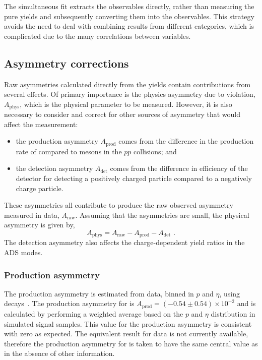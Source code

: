The simultaneous fit extracts the \CP observables directly, rather than measuring the pure yields and subsequently converting them into the \CP observables. This strategy avoids the need to deal with combining results from different categories, which is complicated due to the many correlations between variables. 

\subsection{Asymmetry corrections}
\label{sec:cpfit:asymmetries}

Raw asymmetries calculated directly from the yields contain contributions from several effects. Of primary importance is the physics asymmetry due to \CP violation, $A_{\text{phys}}$, which is the physical parameter to be measured. However, it is also necessary to consider and correct for other sources of asymmetry that would affect the measurement:
\begin{itemize}
\item the production asymmetry $A_{\text{prod}}$ comes from the difference in the production rate of \Bp compared to \Bm mesons in the $pp$ collisions; and
\item the detection asymmetry $A_{\text{det}}$ comes from the difference in efficiency of the detector for detecting a positively charged particle compared to a negatively charge particle.
\end{itemize}
These asymmetries all contribute to produce the raw observed asymmetry measured in data, $A_{\text{raw}}$. Assuming that the asymmetries are small, the physical asymmetry is given by,
\begin{equation}
A_{\text{phys}} = A_{\text{raw}} - A_{\text{prod}} - A_{\text{det}} \text{ .}
\label{asymmetries}
\end{equation} 
The detection asymmetry also affects the charge-dependent yield ratios in the ADS modes. 

\subsubsection{Production asymmetry}

The \Bpm production asymmetry is estimated from \lhcb \runone data, binned in $p$ and $\eta$, using \decay{\Bp}{\Dzb\pip} decays~\cite{LHCb-PAPER-2016-054}. The production asymmetry for \btodkst is $A_{\text{prod}} = (-0.54 \pm 0.54) \times 10^{-2}$ and is calculated by performing a weighted average based on the $p$ and $\eta$ distribution in simulated signal samples. This value for the production asymmetry is consistent with zero as expected. The equivalent result for \runtwo data is not currently available, therefore the production asymmetry for \runtwo is taken to have the same central value as \runone in the absence of other information. 

